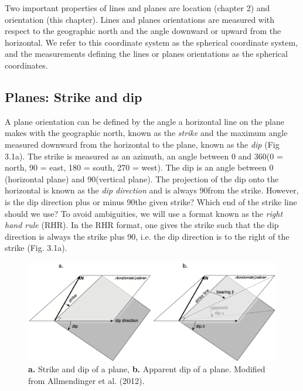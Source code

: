 \documentclass[a4paper , 12pt]{book}
\begin{document}
Two important properties of lines and planes are location (chapter 2) and orientation (this chapter). Lines and planes orientations are measured with respect to the geographic north and the angle downward or upward from the horizontal. We refer to this coordinate system as the spherical coordinate system, and the measurements defining the lines or planes orientations as the spherical coordinates.

\subsection{Planes: Strike and dip}

A plane orientation can be defined by the angle a horizontal line on the plane makes with the geographic north, known as the \textit{strike} and the maximum angle measured downward from the horizontal to the plane, known as the \textit{dip} (Fig 3.1a). The strike is measured as an azimuth, an angle between 0 and  360\degree (0 = north, 90 = east, 180 = south, 270 = west). The dip is an angle between 0 (horizontal plane) and 90\degree (vertical plane). The projection of the dip onto the horizontal is known as the \textit{dip direction} and is always 90\degree from the strike. However, is the dip direction plus or minus 90\degree the given strike? Which end of the strike line should we use? To avoid ambiguities, we will use a format known as the \textit{right hand rule} (RHR). In the RHR format, one gives the strike such that the dip direction is always the strike plus 90\degree, i.e. the dip direction is to the right of the strike (Fig. 3.1a).

\begin{figure}[ht]
    \centering
    \includegraphics[width=13cm]{Figures/ch3f1.png}
    \caption{\textbf{a.} Strike and dip of a plane, \textbf{b.} Apparent dip of a plane. Modified from Allmendinger et al. (2012).}
    \label{fig:strikedip}
\end{figure}
\end{document}
